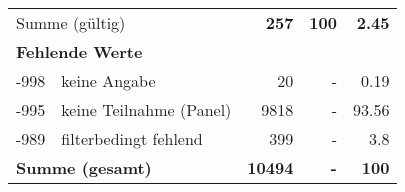 \begin{longtable}{lXrrr}
     \midrule
     \multicolumn{2}{l}{Summe (gültig)} &
       \textbf{\num{257}} &
     \textbf{100} &
       \textbf{\num[round-mode=places,round-precision=2]{2,45}} \\
     \multicolumn{5}{l}{\textbf{Fehlende Werte}}\\
       -998 &
       keine Angabe &
         \num{20} &
        - &
         \num[round-mode=places,round-precision=2]{0,19} \\
       -995 &
       keine Teilnahme (Panel) &
         \num{9818} &
        - &
         \num[round-mode=places,round-precision=2]{93,56} \\
       -989 &
       filterbedingt fehlend &
         \num{399} &
        - &
         \num[round-mode=places,round-precision=2]{3,8} \\
     \midrule
     \multicolumn{2}{l}{\textbf{Summe (gesamt)}} &
          \textbf{\num{10494}} &
        \textbf{-} &
        \textbf{100} \\
     \bottomrule
     \end{longtable}
     
